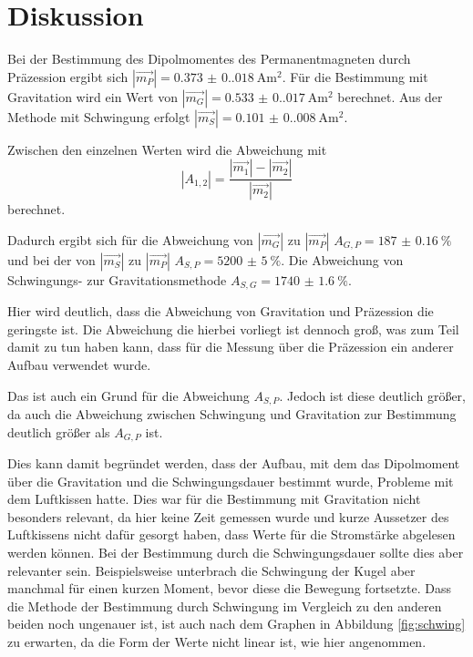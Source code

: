 \section{Diskussion}
Bei der Bestimmung des Dipolmomentes des Permanentmagneten durch Präzession ergibt sich $|\vec{m_P}|=\qty{0.373(0.018)}{\ampere\meter\squared}$.
Für die Bestimmung mit Gravitation wird ein Wert von $|\vec{m_G}|=\qty{0.533(0.017)}{\ampere\meter\squared}$ berechnet.     %
Aus der Methode mit Schwingung erfolgt $|\vec{m_S}|=\qty{0.101(0.008)}{\ampere\meter\squared}$.                                %

Zwischen den einzelnen Werten wird die Abweichung mit 
\begin{equation}
    |A_{1,2}|=\frac{|\vec{m_1}|-|\vec{m_2}|}{|\vec{m_2}|}
\end{equation}
berechnet.

Dadurch ergibt sich für die Abweichung von $|\vec{m_G}|$ zu $|\vec{m_P}|$ $A_{G,P}=\qty{187(0.16)}{\percent}$ und bei der von $|\vec{m_S}|$ zu $|\vec{m_P}|$ $A_{S,P}=\qty{5200(5)}{\percent}$.
Die Abweichung von Schwingungs- zur Gravitationsmethode $A_{S,G}=\qty{1740(1.6)}{\percent}$.

Hier wird deutlich, dass die Abweichung von Gravitation und Präzession die geringste ist.
Die Abweichung die hierbei vorliegt ist dennoch groß, was zum Teil damit zu tun haben kann, dass für die Messung über die 
Präzession ein anderer Aufbau verwendet wurde.

Das ist auch ein Grund für die Abweichung $A_{S,P}$.
Jedoch ist diese deutlich größer, da auch die Abweichung zwischen Schwingung und Gravitation zur Bestimmung deutlich größer als $A_{G,P}$ ist.

Dies kann damit begründet werden, dass der Aufbau, mit dem das Dipolmoment über die Gravitation und 
die Schwingungsdauer bestimmt wurde, Probleme mit dem Luftkissen hatte.
Dies war für die Bestimmung mit Gravitation nicht besonders relevant, da hier keine Zeit gemessen wurde und kurze Aussetzer des Luftkissens nicht dafür gesorgt haben, dass Werte für die Stromstärke abgelesen werden können.
Bei der Bestimmung durch die Schwingungsdauer sollte dies aber relevanter sein.
Beispielsweise unterbrach die Schwingung der Kugel aber manchmal für 
einen kurzen Moment, bevor diese die Bewegung fortsetzte.
Dass die Methode der Bestimmung durch Schwingung im Vergleich zu den anderen beiden noch ungenauer ist, ist auch nach dem Graphen in Abbildung \ref{fig:schwing} zu erwarten, da die Form der Werte nicht linear ist, wie hier angenommen.
\label{sec:Diskussion}
